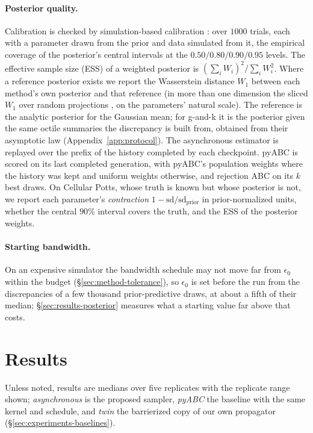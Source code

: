 \documentclass[10pt]{article}
\theoremstyle{plain}
\theoremstyle{definition}
\begin{document}
\paragraph{Posterior quality.} Calibration is checked by simulation-based calibration \citep{talts2018sbc}: over $1000$ trials, each with a parameter drawn from the prior and data simulated from it, the empirical coverage of the posterior's central intervals at the $0.50/0.80/0.90/0.95$ levels. The effective sample size (ESS) of a weighted posterior is $(\sum_i W_i)^2/\sum_i W_i^2$. Where a reference posterior exists we report the Wasserstein distance $W_1$ between each method's own posterior and that reference (in more than one dimension the sliced $W_1$ over random projections \citep{bonneel2015sliced}, on the parameters' natural scale). The reference is the analytic posterior for the Gaussian mean; for g-and-k it is the posterior given the same octile summaries the discrepancy is built from, obtained from their asymptotic law (Appendix~\ref{app:protocol}). The asynchronous estimator is replayed over the prefix of the history completed by each checkpoint. pyABC is scored on its last completed generation, with pyABC's population weights where the history was kept and uniform weights otherwise, and rejection ABC on its $k$ best draws. On Cellular Potts, whose truth is known but whose posterior is not, we report each parameter's \emph{contraction} $1-\mathrm{sd}/\mathrm{sd}_{\mathrm{prior}}$ in prior-normalized units, whether the central $90\%$ interval covers the truth, and the ESS of the posterior weights.

\paragraph{Starting bandwidth.} On an expensive simulator the bandwidth schedule may not move far from $\epsilon_0$ within the budget (\S\ref{sec:method-tolerance}), so $\epsilon_0$ is set before the run from the discrepancies of a few thousand prior-predictive draws, at about a fifth of their median; \S\ref{sec:results-posterior} measures what a starting value far above that costs.

\section{Results}\label{sec:results}
Unless noted, results are medians over five replicates with the replicate range shown; \emph{asynchronous} is the proposed sampler, \emph{pyABC} the baseline with the same kernel and schedule, and \emph{twin} the barrierized copy of our own propagator (\S\ref{sec:experiments-baselines}).
\end{document}
